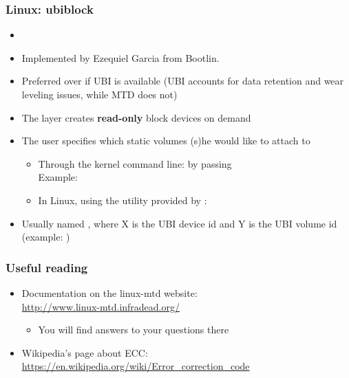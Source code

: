 \begin{frame}
  \frametitle{Linux: ubiblock}
  \begin{itemize}
  \item {}
  \item Implemented by Ezequiel Garcia from Bootlin.
  \item Preferred over  if UBI is available (UBI accounts
    for data retention and wear leveling issues, while MTD does not)
  \item The  layer creates {\bf read-only} block devices
    on demand
  \item The user specifies which static volumes (s)he would like to attach
    to 
    \begin{itemize}
    \item Through the kernel command line: by passing
      \\
      Example: \\
    \item In Linux, using the  utility provided by :
    \end{itemize}
   \item Usually named , where X is the UBI device
     id and Y is the UBI volume id (example: )
  \end{itemize}
\end{frame}

\begin{frame}
  \frametitle{Useful reading}
  \begin{itemize}
  \item Documentation on the linux-mtd website:\\
    \url{http://www.linux-mtd.infradead.org/}
    \begin{itemize}
	\item You will find answers to your questions there
    \end{itemize}
  \item Wikipedia's page about ECC:\\
    \url{https://en.wikipedia.org/wiki/Error_correction_code}
  \end{itemize}
\end{frame}
